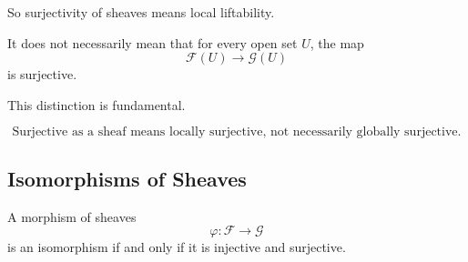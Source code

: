 So surjectivity of sheaves means local liftability.

It does not necessarily mean that for every open set \(U\), the map
\[
\mathcal{F}(U)\to \mathcal{G}(U)
\]
is surjective.

This distinction is fundamental.

\[
\boxed{
	\text{Surjective as a sheaf means locally surjective, not necessarily globally surjective.}
}
\]

\subsection{Isomorphisms of Sheaves}

\begin{theorem}
	A morphism of sheaves
	\[
	\varphi:\mathcal{F}\to \mathcal{G}
	\]
	is an isomorphism if and only if it is injective and surjective.
\end{theorem}
